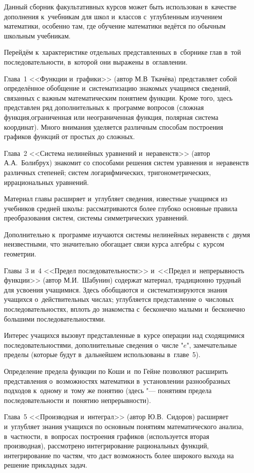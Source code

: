 Данный сборник факультативных курсов может быть использован в~качестве
дополнения к~учебникам для школ и~классов с~углубленным изучением математики,
особенно там, где обучение математики ведётся по обычным школьным учебникам.

Перейдём к~характеристике отдельных представленных в~сборнике глав
в~той последовательности, в~которой они выражены в~оглавлении.

Глава~1 <<Функции и~графики>> (автор М.В~Ткачёва) представляет собой
определённое обобщение и~систематизацию знакомых учащимся сведений,
связанных с важным математическим понятием функции. Кроме того,
здесь представлен ряд дополнительных к~программе вопросов
(сложная функция,ограниченная или неограниченная функция,
полярная система координат). Много внимания уделяется различным способам
построения графиков функций от простых до сложных.

Глава~2 <<Система нелинейных уравнений и~неравенств>> (автор А.А.~Болибрух)
знакомит со способами решения систем уравнения и~неравенств различных степеней;
систем логарифмических, тригонометрических, иррациональных уравнений.

Материал главы расширяет и~углубляет сведения, известные учащимся из учебников
средней школы: рассматриваются более глубоко основные правила
преобразования систем, системы симметрических уравнений.

Дополнительно к~программе изучаются системы нелинейных неравенств
с~двумя неизвестными, что значительно обогащает связи курса алгебры
с~курсом геометрии.

Главы~3 и~4 <<Предел последовательности>> и~<<Предел и~непрерывность функции>>
(автор М.И.~Шабунин) содержат материал, традиционно трудный для усвоения
учащимися. Здесь обобщаются и~систематизируются знания учащихся о~действительных
числах; углубляется представление о~числовых последовательностях,
вплоть до знакомства с~бесконечно малыми
и~бесконечно большими последовательностями.

Интерес учащихся вызовут представленные в~курсе операции над сходящимися
последовательностями, дополнительные сведения о~числе "$e$",
замечательные пределы (которые будут в~дальнейшем использованы в~главе~5).

Определение предела функции по Коши и~по Гейне позволяют расширить представления
о~возможностях математики в~установлении разнообразных подходов к~одному
и~тому же понятию (здесь "--- понятиям предела последовательности
и~понятию непрерывности).

Глава~5 <<Производная и~интеграл>> (автор Ю.В.~Сидоров) расширяет 
и~углубляет знания учащихся по основным понятиям математического анализа,
в~частности, в~вопросах построения графиков (используется вторая производная),
рассмотрено интегрирование рациональных функций, интегрирование по частям,
что даст возможность более широкого выхода на решение прикладных задач.


